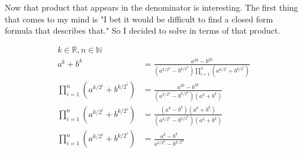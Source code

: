 \documentclass{article}
\newcommand{\qed}{\tag*{$\blacksquare$}}
\begin{document}
Now that product that appears in the denominator is interesting. The first thing that comes to my mind is "I bet it would be difficult to find a closed form formula that describes that." So I decided to solve in terms of that product.

\begin{align*}
    k\in\mathbb{R}, n\in\mathbb{N}\\
    a^k+b^k &= \frac{a^{2k}-b^{2k}}{(a^{k/{2^n}}-b^{k/{2^n}})\prod_{i=1}^{n}(a^{k/{2^i}}+b^{k/{2^i}})}\\
    \prod_{i=1}^{n}{\left(a^{k/{2^i}} + b^{k/{2^i}}\right)} &= \frac{a^{2k}-b^{2k}}{(a^{k/{2^n}}-b^{k/{2^n}})(a^k+b^k)}\\
    \prod_{i=1}^{n}{\left(a^{k/{2^i}} + b^{k/{2^i}}\right)} &= \frac{(a^k-b^k)(a^k+b^k)}{(a^{k/{2^n}}-b^{k/{2^n}})(a^k+b^k)}\\
    \prod_{i=1}^{n}{\left(a^{k/{2^i}} + b^{k/{2^i}}\right)} &= \frac{a^k-b^k}{a^{k/{2^n}}-b^{k/{2^n}}}\\
    \qed
\end{align*}
\end{document}
